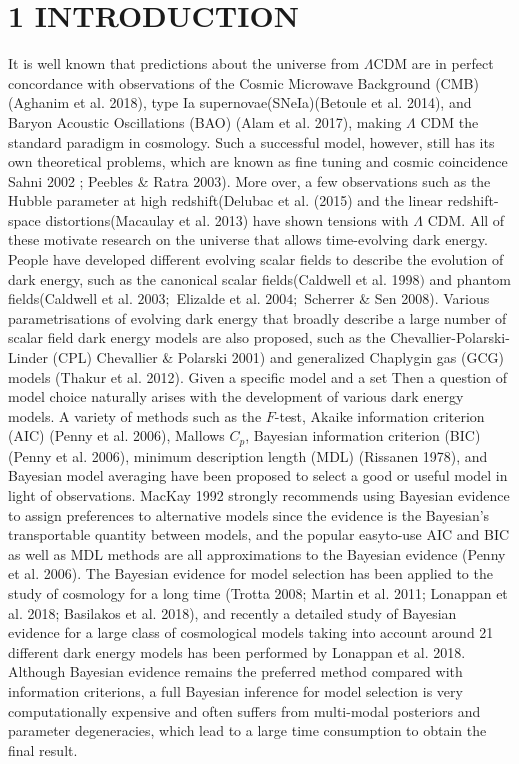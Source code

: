 \documentclass[10pt]{article}
\begin{document}
\section*{1 INTRODUCTION }
It is well known that predictions about the universe from $\Lambda \mathrm{CDM}$ are in perfect concordance with observations of the Cosmic Microwave Background (CMB)(Aghanim et al. 2018), type Ia supernovae(SNeIa)(Betoule et al. 2014), and Baryon Acoustic Oscillations (BAO) (Alam et al. 2017), making $\Lambda$ CDM the standard paradigm in cosmology. Such a successful model, however, still has its own theoretical problems, which are known as fine tuning and cosmic coincidence Sahni 2002 ; Peebles \& Ratra 2003). More over, a few observations such as the Hubble parameter at high redshift(Delubac et al. (2015) and the linear redshift-space distortions(Macaulay et al. 2013) have shown tensions with $\Lambda$ CDM. All of these motivate research on the universe that allows time-evolving dark energy. People have developed different evolving scalar fields to describe the evolution of dark energy, such as the canonical scalar fields(Caldwell et al. 1998$)$ and phantom fields(Caldwell et al. $2003 ;$ Elizalde et al. $2004 ;$ Scherrer \& Sen 2008). Various parametrisations of evolving dark energy that broadly describe a large number of scalar field dark energy models are also proposed, such as the Chevallier-Polarski-Linder (CPL) Chevallier \& Polarski 2001) and generalized Chaplygin gas (GCG) models (Thakur et al. 2012). Given a specific model and a set Then a question of model choice naturally arises with the development of various dark energy models. A variety of methods such as the $F$-test, Akaike information criterion (AIC) (Penny et al. 2006), Mallows $C_{p}$, Bayesian information criterion (BIC) (Penny et al. 2006), minimum description length (MDL) (Rissanen 1978), and Bayesian model averaging have been proposed to select a good or useful model in light of observations. MacKay 1992 strongly recommends using Bayesian evidence to assign preferences to alternative models since the evidence is the Bayesian's transportable quantity between models, and the popular easyto-use AIC and BIC as well as MDL methods are all approximations to the Bayesian evidence (Penny et al. 2006). The Bayesian evidence for model selection has been applied to the study of cosmology for a long time (Trotta 2008; Martin et al. 2011; Lonappan et al. 2018; Basilakos et al. 2018), and recently a detailed study of Bayesian evidence for a large class of cosmological models taking into account around 21 different dark energy models has been performed by Lonappan et al. 2018. Although Bayesian evidence remains the preferred method compared with information criterions, a full Bayesian inference for model selection is very computationally expensive and often suffers from multi-modal posteriors and parameter degeneracies, which lead to a large time consumption to obtain the final result.
\end{document}
